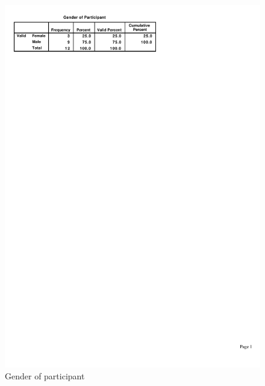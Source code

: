 \documentclass[a4paper, 12pt]{report}
\begin{document}
\begin{figure}[ht]
\centerline{\includegraphics{figures/Gender.pdf}}
\caption{Gender of participant}
\label{fig:partic_gender}
\end{figure}
\end{document}

